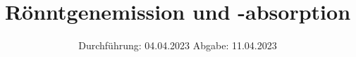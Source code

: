 



\subject{V602}
\title{Rönntgenemission und -absorption}
\date{%
  Durchführung: 04.04.2023
  \hspace{3em}
  Abgabe: 11.04.2023
}


\setlength{\parindent}{0pt} %

\maketitle
\thispagestyle{empty}
\tableofcontents
\newpage







\printbibliography{}




